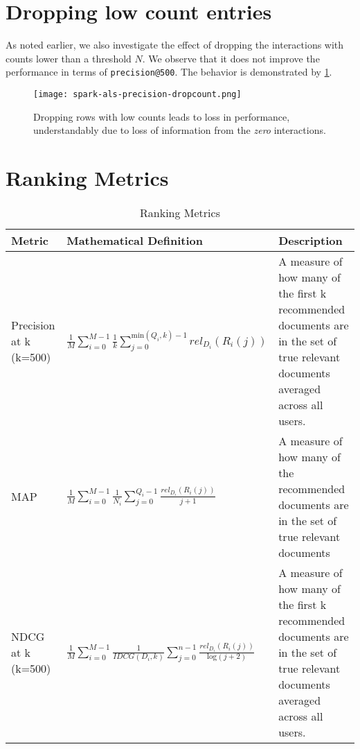 \documentclass{article}
\begin{document}
\section{Dropping low count entries}

As noted earlier, we also investigate the effect of dropping the interactions with counts lower than a threshold $N$. We observe that it does not improve the performance in terms of \texttt{precision@500}. The behavior is demonstrated by \cref{fig:precision_drop_count}.

\begin{figure}[!ht]
    \centering
    \texttt{[image: spark-als-precision-dropcount.png]}
    \caption{Dropping rows with low counts leads to loss in performance, understandably due to loss of information from the \emph{zero} interactions.}
    \label{fig:precision_drop_count}
\end{figure}



\section{Ranking Metrics}
\begin{table}[H]
\centering
\begin{tabular}{|>{\centering\arraybackslash}m{2.2cm}|>{\centering\arraybackslash} m{6cm}|>{\arraybackslash} m{5.8cm}|}
\hline 
\textbf{Metric} & \textbf{Mathematical Definition} & \textbf{Description} \\ 
\hline

Precision at k (k=500)
& $\frac{1}{M} \sum_{i=0}^{M-1} {\frac{1}{k} \sum_{j=0}^{\text{min}(Q_i, k) - 1} rel_{D_i}(R_i(j))}$  
& {A measure of how many of the first k recommended documents are in the set of true relevant documents averaged across all users.} \\
\hline
MAP
& $\frac{1}{M} \sum_{i=0}^{M-1} {\frac{1}{N_i} \sum_{j=0}^{Q_i-1} \frac{rel_{D_i}(R_i(j))}{j + 1}}$
& {A measure of how many of the recommended documents are in the set of true relevant documents}\\
\hline
NDCG at k (k=500)
& $\frac{1}{M} \sum_{i=0}^{M-1} {\frac{1}{IDCG(D_i, k)}\sum_{j=0}^{n-1} \frac{rel_{D_i}(R_i(j))}{\text{log}(j+2)}} $
& {A measure of how many of the first k recommended documents are in the set of true relevant documents averaged across all users.} \\
        
\hline
\end{tabular}
\caption{Ranking Metrics}
\label{4}
\end{table}
\end{document}

